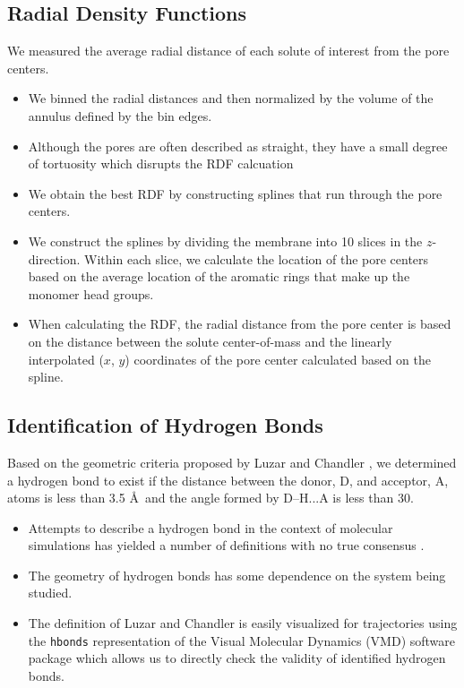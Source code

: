 \documentclass{article}
\begin{document}
  \subsection*{Radial Density Functions}

  We measured the average radial distance of each solute of interest from the pore
  centers.
  \begin{itemize}
	\item We binned the radial distances and then normalized by the volume
	of the annulus defined by the bin edges.
	\item Although the pores are often described as straight, they have a
	small degree of tortuosity which disrupts the RDF calcuation 
	\item We obtain the best RDF by constructing splines that run through the
	pore centers.
	\item We construct the splines by dividing the membrane into 10 slices
	in the $z$-direction. Within each slice, we calculate the location of 
	the pore centers based on the average location of the aromatic rings
	that make up the monomer head groups.
	\item When calculating the RDF, the radial distance from the pore center
	is based on the distance between the solute center-of-mass and the linearly
	interpolated ($x$, $y$)	coordinates of the pore center calculated based
	on the spline.
  \end{itemize}
  
  \subsection*{Identification of Hydrogen Bonds}
  
  Based on the geometric criteria proposed by Luzar and Chandler \cite{luzar_effect_1996},
  we determined a hydrogen bond to exist if the distance between the donor, D, and acceptor,
  A, atoms is less than 3.5 \AA~and the angle formed by D--H...A is less than 30\degree.
  \begin{itemize}
    \item Attempts to describe a hydrogen bond in the context of molecular simulations has
    yielded a number of definitions with no true consensus \cite{prada-gracia_quest_2013}.
	\item The geometry of hydrogen bonds has some dependence on the system being studied. 
    \item The definition of Luzar and Chandler is easily visualized for trajectories using
    the \texttt{hbonds} representation of the Visual Molecular Dynamics (VMD) software 
    package which allows us to directly check the validity of identified hydrogen bonds.
  \end{itemize}
\end{document}
